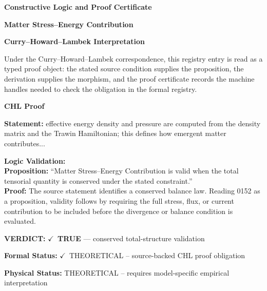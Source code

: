 \clearpage
\begingroup\tzpsupportsetup
\noindent\textbf{\fontsize{10.8pt}{12.8pt}\selectfont [ID 0152] Constructive Logic and Proof Certificate}\par
\noindent\textbf{\fontsize{10pt}{12pt}\selectfont Matter Stress--Energy Contribution}\par
\vspace{0.45em}
\begingroup
\footnotesize
\setlength{\parskip}{0.22em}
\setlength{\parindent}{0pt}
\noindent\textbf{Curry--Howard--Lambek Interpretation}\par
Under the Curry--Howard--Lambek correspondence, this registry entry is read as a typed proof
object: the stated source condition supplies the proposition, the derivation supplies the
morphism, and the proof certificate records the machine handles needed to check the obligation
in the formal registry.

\vspace{0.45em}
\noindent\textbf{CHL Proof}\par
\textbf{Statement:} effective energy density and pressure are computed from the density matrix and the
Trawin Hamiltonian; this defines how emergent matter contributes...

\textbf{Logic Validation:}\\
\textbf{Proposition:} ``Matter Stress--Energy Contribution is valid when the total tensorial quantity is
conserved under the stated constraint.''\\
\textbf{Proof:} The source statement identifies a conserved balance law. Reading 0152 as a proposition,
validity follows by requiring the full stress, flux, or current contribution to be
included before the divergence or balance condition is evaluated.

\textbf{VERDICT:} \ensuremath{\checkmark}\ \textbf{TRUE} --- conserved total-structure validation

\textbf{Formal Status:} \ensuremath{\checkmark}\ THEORETICAL -- source-backed CHL proof obligation

\textbf{Physical Status:} THEORETICAL -- requires model-specific empirical interpretation
\par\vspace{0.45em}
\par
\ifTZPDarkEdition
{}
\fi
\endgroup
\endgroup
